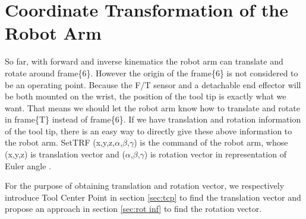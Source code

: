 \section{Coordinate Transformation of the Robot Arm}
\label{sec:ref_robot}
So far, with forward and inverse kinematics the robot arm can translate and rotate around frame\{6\}. However the origin of the frame\{6\} is not considered to be an operating point. Because the F/T sensor and a detachable end effector will be both mounted on the wrist, the position of the tool tip is exactly what we want. That means we should let the robot arm know how to translate and rotate in frame\{T\} instead of frame\{6\}. If we have translation and rotation information of the tool tip, there is an easy way to directly give these above information to the robot arm. SetTRF (x,y,z,$\alpha$,$\beta$,$\gamma$) is the command of the robot arm, whose (x,y,z) is translation vector and ($\alpha$,$\beta$,$\gamma$) is rotation vector in representation of Euler angle .
\par
For the purpose of obtaining translation and rotation vector, we respectively introduce Tool Center Point in section \ref{sec:tcp} to find the translation vector and propose an approach in section \ref{sec:rot inf} to find the rotation vector.							

